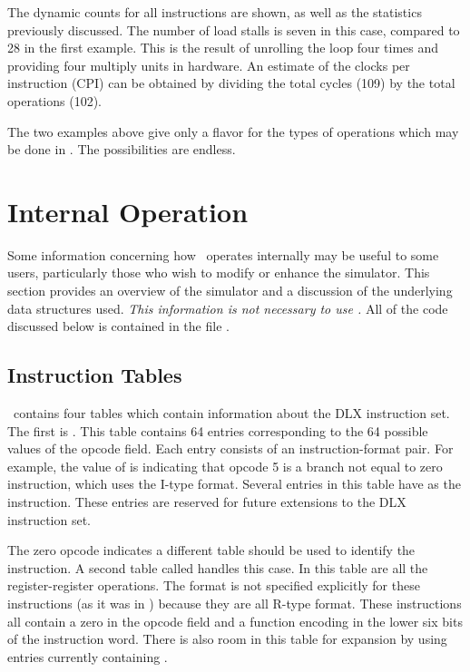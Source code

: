 The dynamic counts for all instructions are shown, as well as the
statistics previously discussed.  The number of load stalls is seven
in this case, compared to 28 in the first example.  This is the result
of unrolling the loop four times and providing four multiply units in
hardware.  An estimate of the clocks per instruction (CPI) can be
obtained by dividing the total cycles (109) by the total operations
(102).

The two examples above give only a flavor for the types of operations which
may be done in \dlxsim.  The possibilities are endless.

\pagebreak

\section{Internal Operation}

Some information concerning how \dlxsim\ operates internally may be
useful to some users, particularly those who wish to modify or enhance
the simulator.  This section provides an overview of
the simulator and a discussion of the underlying data structures used.
{\it This information is not necessary to use \dlxsim.}
All of the code discussed below is contained in the file .

\subsection{Instruction Tables}

\dlxsim\ contains four tables which contain information about the DLX
instruction set.  The first is .  This table contains 64
entries corresponding to the 64 possible values of the opcode field.  Each
entry consists of an instruction-format pair.  For example, the value of
 is  indicating that opcode 5
is a branch not equal to zero instruction, which uses the I-type format.
Several entries in this table have  as the instruction.  These
entries are reserved for future extensions to the DLX instruction set.

The zero opcode indicates a different table should be used to identify
the instruction.  A second table called  handles
this case.  In this table are all the register-register operations.
The format is not specified explicitly for these instructions (as it
was in ) because they are all R-type format.  These
instructions all contain a zero in the opcode field and a function
encoding in the lower six bits of the instruction word.  There is also
room in this table for expansion by using entries currently containing
.

